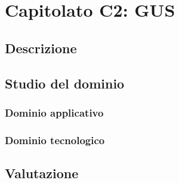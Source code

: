 %


\section{Capitolato C2: GUS}

\subsection{Descrizione}

\subsection{Studio del dominio}
\subsubsection{Dominio applicativo}
\subsubsection{Dominio tecnologico}

\subsection{Valutazione}